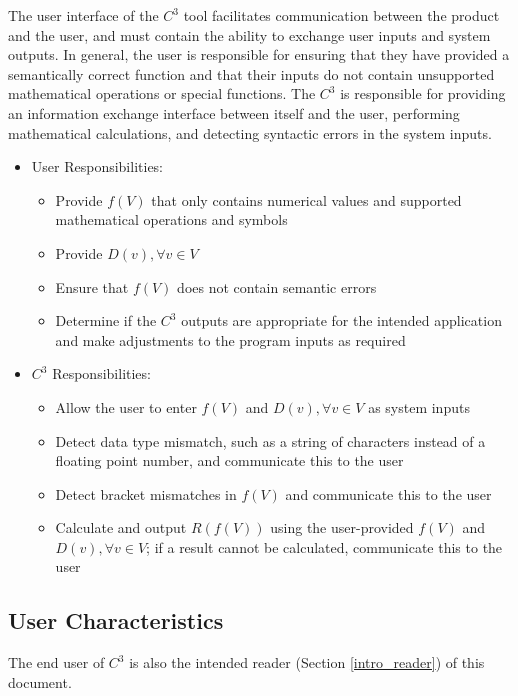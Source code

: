 \documentclass[12pt]{article}
\newcommand{\prognameAbbrv}{$C^{3}$}
\begin{document}
The user interface of the \prognameAbbrv{} tool facilitates communication 
between the product and the user, and must contain the ability to exchange user 
inputs and system outputs. In general, the user is responsible for ensuring 
that they have provided a semantically correct function and that their inputs 
do not contain unsupported mathematical operations or special functions. The 
\prognameAbbrv{} is responsible for providing an information exchange interface 
between itself and the user, performing mathematical calculations, and 
detecting syntactic errors in the system inputs.

\begin{itemize}
	\item User Responsibilities:
	\begin{itemize}
		\item Provide $f(V)$ that only contains numerical values and supported 
		mathematical operations and symbols
		\item Provide $D(v), \forall v\in V$
		\item Ensure that $f(V)$ does not contain semantic errors
		\item Determine if the \prognameAbbrv{} outputs are appropriate for 
		the intended application and make adjustments to the program inputs as 
		required
	\end{itemize}
	\newpage
	\item \prognameAbbrv{} Responsibilities:
	\begin{itemize}
		\item Allow the user to enter $f(V)$ and $D(v), \forall v\in V$	as 
		system inputs
		\item Detect data type mismatch, such as a string of characters instead 
		of a floating point number, and communicate this to the user
		\item Detect bracket mismatches in $f(V)$ and communicate this to the 
		user
		\item Calculate and output $R(f(V))$ using the user-provided $f(V)$ and 
		$D(v), \forall v\in V$; if a result cannot be calculated, communicate 
		this to the user
	\end{itemize}
\end{itemize}

\subsection{User Characteristics} \label{SecUserCharacteristics}
The end user of \prognameAbbrv{} is also the intended reader (Section 
\ref{intro_reader}) of this document.
\end{document}

